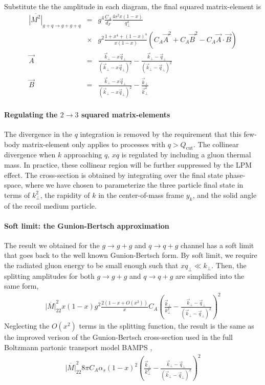 Substitute the the amplitude in each diagram, the final squared matrix-element is 
\begin{eqnarray}
\overline{|M^2|}_{g+q\rightarrow g+g+q} &=&
g^4 \frac{C_A}{d_F}\frac{4s^2x(1-x)}{q_\perp^4} \\\nonumber
&\times&g^2\frac{1+x^4+(1-x)^4}{x(1-x)}   
\left(C_A\vec{A}^2 + C_A\vec{B}^2 - C_A\vec{A}\cdot\vec{B}\right)\\
\vec{A} &=& \frac{\vec{k}_\perp - x\vec{q}_\perp}{(\vec{k}_\perp - x\vec{q}_\perp)^2} -  \frac{\vec{k}_\perp - \vec{q}_\perp}{(\vec{k}_\perp - \vec{q}_\perp)^2} \\
\vec{B} &=& \frac{\vec{k}_\perp - x\vec{q}_\perp}{(\vec{k}_\perp - x\vec{q}_\perp)^2} -  \frac{\vec{k}_\perp}{\vec{k}_\perp^2}
\end{eqnarray}

\paragraph{Regulating the $2\rightarrow 3$ squared matrix-elements}
The divergence in the $q$ integration is removed by the requirement that this few-body matrix-element only applies to processes with $q>Q_{\textrm{cut}}$.
The collinear divergence when $k$ approaching $q$, $xq$ is regulated by including a gluon thermal mass. 
In practice, these collinear region will be further suppressed by the LPM effect.
The cross-section is obtained by integrating over the final state phase-space, where we have chosen to parameterize the three particle final state in terms of $k_\perp^2$, the rapidity of $k$ in the center-of-mass frame $y_k$, and the solid angle of the recoil medium particle.

\paragraph{Soft limit: the Gunion-Bertsch approximation}
The result we obtained for the $g\rightarrow g+g$ and $q\rightarrow q+g$ channel has a soft limit that goes back to the well known Gunion-Bertsch form. 
By soft limit, we require the radiated gluon energy to be small enough such that $xq_\perp \ll k_\perp$.
Then, the splitting amplitudes for both $g\rightarrow g+g$ and  $q\rightarrow q+g$ are simplified into the same form,
\begin{eqnarray}
\overline{|M|}^2_{22} x(1-x)g^2 \frac{2(1-x+O(x^2))}{x} C_A \left(\frac{\vec{k}_\perp}{k_\perp^2}-\frac{\vec{k}_\perp-\vec{q}_\perp}{(\vec{k}_\perp-\vec{q}_\perp)^2}\right)^2
\end{eqnarray}
Neglecting the $O(x^2)$ terms in the splitting function, the result is the same as the improved verison of the Gunion-Bertsch cross-section \cite{Fochler:2013epa} used in the full Boltzmann partonic transport model BAMPS \cite{Xu:2004mz},
\begin{eqnarray}
\overline{|M|}^2_{22} 8\pi C_A\alpha_s (1-x)^2 \left(\frac{\vec{k}_\perp}{k_\perp^2}-\frac{\vec{k}_\perp-\vec{q}_\perp}{(\vec{k}_\perp-\vec{q}_\perp)^2}\right)^2
\end{eqnarray}

